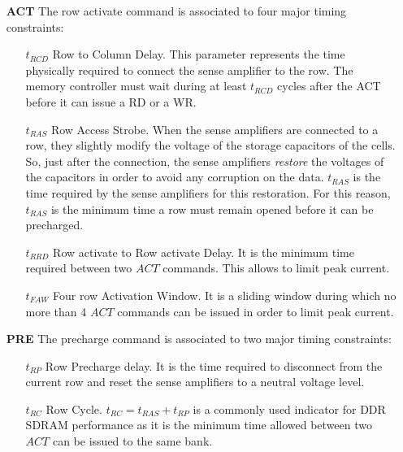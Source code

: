 \documentclass[main.tex]{subfiles}
\begin{document}
\begin{itemize}
    \item[\textbf{ACT}] The row activate command is associated to four major
        timing constraints:
        \begin{itemize}
            \item[$t_{RCD}$] Row to Column Delay. This parameter represents the
                time physically required to connect the sense amplifier to the
                row. The memory controller must wait during at least $t_{RCD}$
                cycles after the ACT before it can issue a RD or a WR.
            \item[$t_{RAS}$] Row Access Strobe. When the sense amplifiers are
                connected to a row, they slightly modify the voltage of the
                storage capacitors of the cells. So, just after the connection,
                the sense amplifiers \emph{restore} the voltages of the
                capacitors in order to avoid any corruption on the data.
                $t_{RAS}$ is the time required by the sense amplifiers for this
                restoration. For this reason, $t_{RAS}$ is the minimum time a
                row must remain opened before it can be precharged.
            \item[$t_{RRD}$] Row activate to Row activate Delay. It is the
                minimum time required between two $ACT$ commands. This allows
                to limit peak current.
            \item[$t_{FAW}$] Four row Activation Window. It is a sliding window
                during which no more than 4 $ACT$ commands can be issued in
                order to limit peak current.
        \end{itemize}
    
    \item[\textbf{PRE}] The precharge command is associated to two major timing
        constraints:
        \begin{itemize}
            \item[$t_{RP}$] Row Precharge delay. It is the time required to
                disconnect from the current row and reset the sense amplifiers
                to a neutral voltage level.
            \item[$t_{RC}$] Row Cycle. $t_{RC} = t_{RAS} + t_{RP}$ is a
                commonly used indicator for DDR SDRAM performance as it is the
                minimum time allowed between two $ACT$ can be issued to the
                same bank.
        \end{itemize}


\end{itemize}
\end{document}
